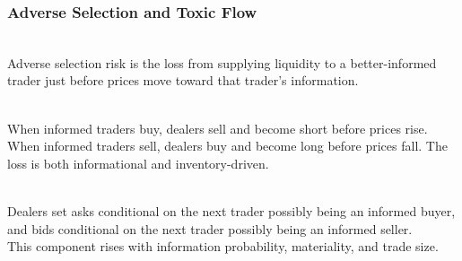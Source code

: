 \subsubsection{Adverse Selection and Toxic Flow}

\begin{definition} \\
Adverse selection risk is the loss from supplying liquidity to a better-informed trader just before prices move toward that trader's information.
\end{definition}

\begin{mechanism} \\
When informed traders buy, dealers sell and become short before prices rise. When informed traders sell, dealers buy and become long before prices fall. The loss is both informational and inventory-driven.
\end{mechanism}

\begin{principle} \\
Dealers set asks conditional on the next trader possibly being an informed buyer, and bids conditional on the next trader possibly being an informed seller.\\
This component rises with information probability, materiality, and trade size.
\end{principle}

